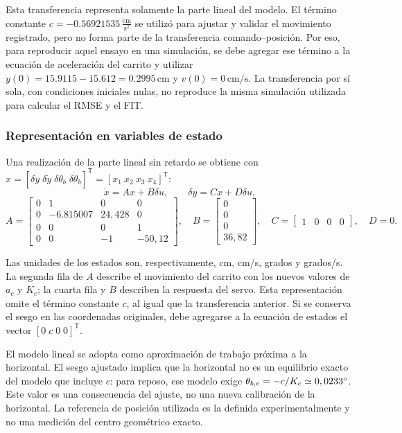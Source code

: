 \documentclass[a4paper, twoside, 10pt, spanish]{article}
\numberwithin{table}{section}
\begin{document}
    Esta transferencia representa solamente la parte lineal del modelo. El término constante $c=-0.56921535\,\frac{\text{cm}}{\text{s}^2}$ se utilizó para ajustar y validar el movimiento registrado, pero no forma parte de la transferencia comando--posición. Por eso, para reproducir aquel ensayo en una simulación, se debe agregar ese término a la ecuación de aceleración del carrito y utilizar $y(0)=15.9115-15.612=0.2995\,\text{cm}$ y $v(0)=0\,\text{cm/s}$. La transferencia por sí sola, con condiciones iniciales nulas, no reproduce la misma simulación utilizada para calcular el RMSE y el FIT.

    \subsubsection{Representación en variables de estado}
    Una realización de la parte lineal sin retardo se obtiene con
    $x=[\delta y\;\delta\dot y\;\delta\theta_b\;\delta\dot\theta_b]^\mathsf{T} = [x_1 \ x_2 \ x_3 \ x_4]^\mathsf{T}$:
    \begin{equation}
        \dot x=Ax+B\delta u,\qquad \delta y=Cx+D\delta u,
    \end{equation}
    \[
        A=\begin{bmatrix}
            0&1&0&0\\
            0&-6.815007&24,428&0\\
            0&0&0&1\\
            0&0&-1&-50,12
        \end{bmatrix},\quad
        B=\begin{bmatrix}0\\0\\0\\36,82\end{bmatrix},\quad
        C=\begin{bmatrix}1&0&0&0\end{bmatrix},\quad D=0.
        \label{eq:estados_planta}
    \]

    Las unidades de los estados son, respectivamente, cm, cm/s, grados y grados/s. La segunda fila de $A$ describe el movimiento del carrito con los nuevos valores de $a_c$ y $K_c$; la cuarta fila y $B$ describen la respuesta del servo. Esta representación omite el término constante $c$, al igual que la transferencia anterior. Si se conserva el sesgo en las coordenadas originales, debe agregarse a la ecuación de estados el vector $[0\;c\;0\;0]^\mathsf{T}$.

    El modelo lineal se adopta como aproximación de trabajo próxima a la horizontal. El sesgo ajustado implica que la horizontal no es un equilibrio exacto del modelo que incluye $c$: para reposo, ese modelo exige $\theta_{b,e}=-c/K_c \simeq 0,0233\degree$. Este valor es una consecuencia del ajuste, no una nueva calibración de la horizontal. La referencia de posición utilizada es la definida experimentalmente y no una medición del centro geométrico exacto.
\end{document}
